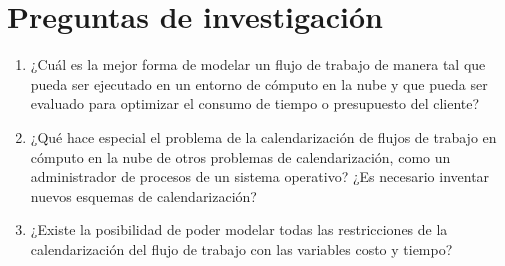 \documentclass[letterpaper]{report}
\begin{document}
\section{Preguntas de investigación}
\begin{enumerate}
\item ¿Cuál es la mejor forma de modelar un flujo de trabajo de manera tal que pueda ser ejecutado en un entorno de cómputo en la nube y que pueda ser evaluado para optimizar el consumo de tiempo o presupuesto del cliente?
\item ¿Qué hace especial el problema de la calendarización de flujos de trabajo en cómputo en la nube de otros problemas de calendarización, como un administrador de procesos de un sistema operativo? ¿Es necesario inventar nuevos esquemas de calendarización?
\item ¿Existe la posibilidad de poder modelar todas las restricciones de la calendarización del flujo de trabajo con las variables costo y tiempo?
\end{enumerate}




\end{document}
